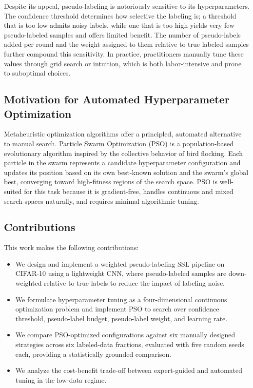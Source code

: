 \documentclass[journal]{IEEEtran}
\begin{document}
Despite its appeal, pseudo-labeling is notoriously sensitive to its
hyperparameters. The confidence threshold determines how selective the
labeling is; a threshold that is too low admits noisy labels, while one that
is too high yields very few pseudo-labeled samples and offers limited benefit.
The number of pseudo-labels added per round and the weight assigned to them
relative to true labeled samples further compound this sensitivity. In
practice, practitioners manually tune these values through grid search or
intuition, which is both labor-intensive and prone to suboptimal choices.

\subsection{Motivation for Automated Hyperparameter Optimization}

Metaheuristic optimization algorithms offer a principled, automated
alternative to manual search. Particle Swarm Optimization (PSO)
\cite{kennedy1995pso} is a population-based evolutionary algorithm inspired
by the collective behavior of bird flocking. Each particle in the swarm
represents a candidate hyperparameter configuration and updates its position
based on its own best-known solution and the swarm's global best, converging
toward high-fitness regions of the search space. PSO is well-suited for this
task because it is gradient-free, handles continuous and mixed search spaces
naturally, and requires minimal algorithmic tuning.

\subsection{Contributions}

This work makes the following contributions:
\begin{itemize}
    \item We design and implement a weighted pseudo-labeling SSL pipeline on
    CIFAR-10 using a lightweight CNN, where pseudo-labeled samples are down-
    weighted relative to true labels to reduce the impact of labeling noise.
    \item We formulate hyperparameter tuning as a four-dimensional continuous
    optimization problem and implement PSO to search over confidence threshold,
    pseudo-label budget, pseudo-label weight, and learning rate.
    \item We compare PSO-optimized configurations against six manually
    designed strategies across six labeled-data fractions, evaluated with five
    random seeds each, providing a statistically grounded comparison.
    \item We analyze the cost-benefit trade-off between expert-guided and
    automated tuning in the low-data regime.
\end{itemize}
\end{document}

